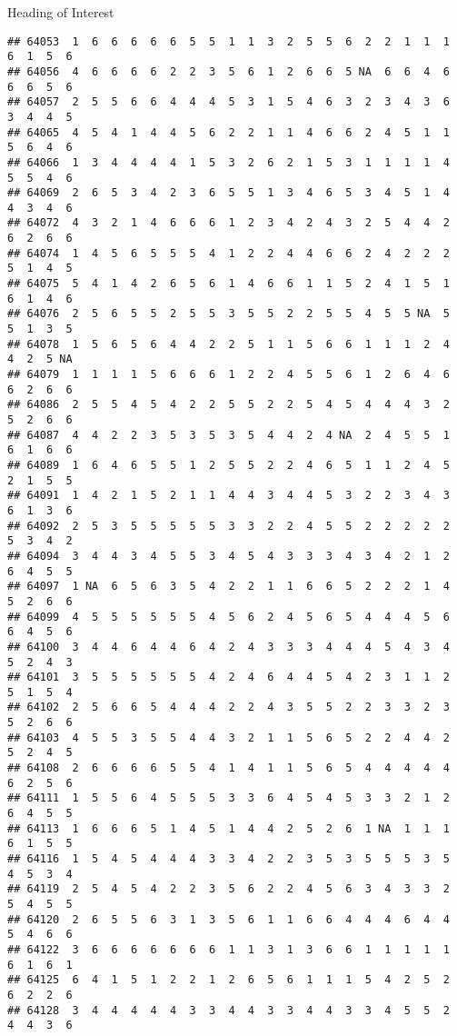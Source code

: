 \documentclass[
  ignorenonframetext,
]{beamer}
\begin{document}
\begin{frame}[fragile]{Heading of Interest}
\begin{verbatim}
## 64053  1  6  6  6  6  6  5  5  1  1  3  2  5  5  6  2  2  1  1  1  6  1  5  6
## 64056  4  6  6  6  6  2  2  3  5  6  1  2  6  6  5 NA  6  6  4  6  6  6  5  6
## 64057  2  5  5  6  6  4  4  4  5  3  1  5  4  6  3  2  3  4  3  6  3  4  4  5
## 64065  4  5  4  1  4  4  5  6  2  2  1  1  4  6  6  2  4  5  1  1  5  6  4  6
## 64066  1  3  4  4  4  4  1  5  3  2  6  2  1  5  3  1  1  1  1  4  5  5  4  6
## 64069  2  6  5  3  4  2  3  6  5  5  1  3  4  6  5  3  4  5  1  4  4  3  4  6
## 64072  4  3  2  1  4  6  6  6  1  2  3  4  2  4  3  2  5  4  4  2  6  2  6  6
## 64074  1  4  5  6  5  5  5  4  1  2  2  4  4  6  6  2  4  2  2  2  5  1  4  5
## 64075  5  4  1  4  2  6  5  6  1  4  6  6  1  1  5  2  4  1  5  1  6  1  4  6
## 64076  2  5  6  5  5  2  5  5  3  5  5  2  2  5  5  4  5  5 NA  5  5  1  3  5
## 64078  1  5  6  5  6  4  4  2  2  5  1  1  5  6  6  1  1  1  2  4  4  2  5 NA
## 64079  1  1  1  1  5  6  6  6  1  2  2  4  5  5  6  1  2  6  4  6  6  2  6  6
## 64086  2  5  5  4  5  4  2  2  5  5  2  2  5  4  5  4  4  4  3  2  5  2  6  6
## 64087  4  4  2  2  3  5  3  5  3  5  4  4  2  4 NA  2  4  5  5  1  6  1  6  6
## 64089  1  6  4  6  5  5  1  2  5  5  2  2  4  6  5  1  1  2  4  5  2  1  5  5
## 64091  1  4  2  1  5  2  1  1  4  4  3  4  4  5  3  2  2  3  4  3  6  1  3  6
## 64092  2  5  3  5  5  5  5  5  3  3  2  2  4  5  5  2  2  2  2  2  5  3  4  2
## 64094  3  4  4  3  4  5  5  3  4  5  4  3  3  3  4  3  4  2  1  2  6  4  5  5
## 64097  1 NA  6  5  6  3  5  4  2  2  1  1  6  6  5  2  2  2  1  4  5  2  6  6
## 64099  4  5  5  5  5  5  5  4  5  6  2  4  5  6  5  4  4  4  5  6  6  4  5  6
## 64100  3  4  4  6  4  4  6  4  2  4  3  3  3  4  4  4  5  4  3  4  5  2  4  3
## 64101  3  5  5  5  5  5  5  4  2  4  6  4  4  5  4  2  3  1  1  2  5  1  5  4
## 64102  2  5  6  6  5  4  4  4  2  2  4  3  5  5  2  2  3  3  2  3  5  2  6  6
## 64103  4  5  5  3  5  5  4  4  3  2  1  1  5  6  5  2  2  4  4  2  5  2  4  5
## 64108  2  6  6  6  6  5  5  4  1  4  1  1  5  6  5  4  4  4  4  4  6  2  5  6
## 64111  1  5  5  6  4  5  5  5  3  3  6  4  5  4  5  3  3  2  1  2  6  4  5  5
## 64113  1  6  6  6  5  1  4  5  1  4  4  2  5  2  6  1 NA  1  1  1  6  1  5  5
## 64116  1  5  4  5  4  4  4  3  3  4  2  2  3  5  3  5  5  5  3  5  4  5  3  4
## 64119  2  5  4  5  4  2  2  3  5  6  2  2  4  5  6  3  4  3  3  2  5  4  5  5
## 64120  2  6  5  5  6  3  1  3  5  6  1  1  6  6  4  4  4  6  4  4  5  4  6  6
## 64122  3  6  6  6  6  6  6  6  1  1  3  1  3  6  6  1  1  1  1  1  6  1  6  1
## 64125  6  4  1  5  1  2  2  1  2  6  5  6  1  1  1  5  4  2  5  2  6  2  2  6
## 64128  3  4  4  4  4  4  3  3  4  4  3  3  4  4  3  3  4  5  5  2  4  4  3  6

\end{verbatim}
\end{frame}
\end{document}

